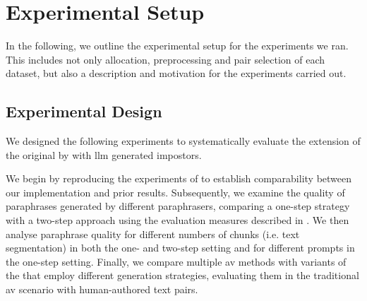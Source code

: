 \chapter{Experimental Setup}
\label{chap:experimental_setup}

In the following, we outline the experimental setup for the experiments we ran.
This includes not only allocation, preprocessing and pair selection of each dataset, but also a description and motivation for the experiments carried out.






\section{Experimental Design}
\label{sec:experimental_setup}

We designed the following experiments to systematically evaluate the extension of the original \impAppr{} by \citet{koppel_determining_2014} with \ac{llm} generated impostors. 

We begin by reproducing the experiments of \citet{koppel_determining_2014} to establish comparability between our implementation and prior results.
Subsequently, we examine the quality of paraphrases generated by different paraphrasers, comparing a one-step strategy with a two-step approach using the evaluation measures described in .
We then analyse paraphrase quality for different numbers of chunks (i.e. text segmentation) in both the one- and two-step setting and for different prompts in the one-step setting.
Finally, we compare multiple \ac{av} methods with variants of the \impAppr{} that employ different \imp{} generation strategies, evaluating them in the traditional \ac{av} scenario with human-authored text pairs.









% 

% 

% 








